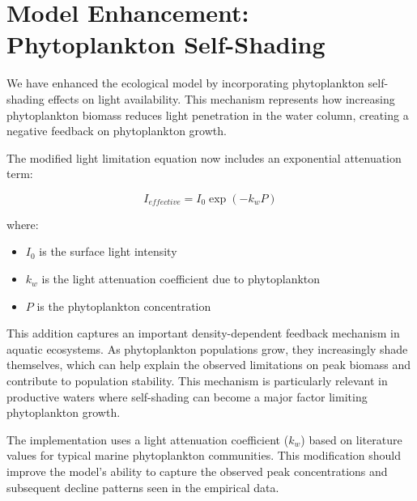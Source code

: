 \section{Model Enhancement: Phytoplankton Self-Shading}

We have enhanced the ecological model by incorporating phytoplankton self-shading effects on light availability. This mechanism represents how increasing phytoplankton biomass reduces light penetration in the water column, creating a negative feedback on phytoplankton growth.

The modified light limitation equation now includes an exponential attenuation term:

\[ I_{effective} = I_0 \exp(-k_w P) \]

where:
\begin{itemize}
\item $I_0$ is the surface light intensity
\item $k_w$ is the light attenuation coefficient due to phytoplankton
\item $P$ is the phytoplankton concentration
\end{itemize}

This addition captures an important density-dependent feedback mechanism in aquatic ecosystems. As phytoplankton populations grow, they increasingly shade themselves, which can help explain the observed limitations on peak biomass and contribute to population stability. This mechanism is particularly relevant in productive waters where self-shading can become a major factor limiting phytoplankton growth.

The implementation uses a light attenuation coefficient ($k_w$) based on literature values for typical marine phytoplankton communities. This modification should improve the model's ability to capture the observed peak concentrations and subsequent decline patterns seen in the empirical data.
